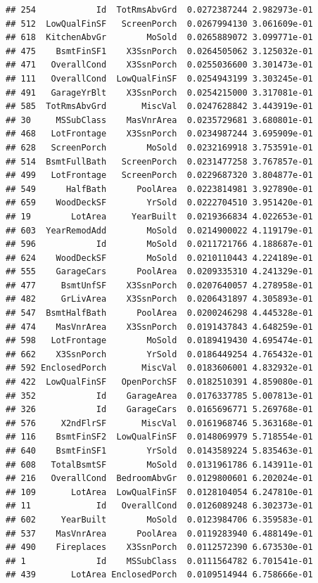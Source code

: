 \documentclass[american,]{article}
\theoremstyle{definition}
\theoremstyle{definition}
\theoremstyle{definition}
\theoremstyle{remark}
\begin{document}
\begin{verbatim}
## 254            Id  TotRmsAbvGrd  0.0272387244 2.982973e-01
## 512  LowQualFinSF   ScreenPorch  0.0267994130 3.061609e-01
## 618  KitchenAbvGr        MoSold  0.0265889072 3.099771e-01
## 475    BsmtFinSF1    X3SsnPorch  0.0264505062 3.125032e-01
## 471   OverallCond    X3SsnPorch  0.0255036600 3.301473e-01
## 111   OverallCond  LowQualFinSF  0.0254943199 3.303245e-01
## 491   GarageYrBlt    X3SsnPorch  0.0254215000 3.317081e-01
## 585  TotRmsAbvGrd       MiscVal  0.0247628842 3.443919e-01
## 30     MSSubClass    MasVnrArea  0.0235729681 3.680801e-01
## 468   LotFrontage    X3SsnPorch  0.0234987244 3.695909e-01
## 628   ScreenPorch        MoSold  0.0232169918 3.753591e-01
## 514  BsmtFullBath   ScreenPorch  0.0231477258 3.767857e-01
## 499   LotFrontage   ScreenPorch  0.0229687320 3.804877e-01
## 549      HalfBath      PoolArea  0.0223814981 3.927890e-01
## 659    WoodDeckSF        YrSold  0.0222704510 3.951420e-01
## 19        LotArea     YearBuilt  0.0219366834 4.022653e-01
## 603  YearRemodAdd        MoSold  0.0214900022 4.119179e-01
## 596            Id        MoSold  0.0211721766 4.188687e-01
## 624    WoodDeckSF        MoSold  0.0210110443 4.224189e-01
## 555    GarageCars      PoolArea  0.0209335310 4.241329e-01
## 477     BsmtUnfSF    X3SsnPorch  0.0207640057 4.278958e-01
## 482     GrLivArea    X3SsnPorch  0.0206431897 4.305893e-01
## 547  BsmtHalfBath      PoolArea  0.0200246298 4.445328e-01
## 474    MasVnrArea    X3SsnPorch  0.0191437843 4.648259e-01
## 598   LotFrontage        MoSold  0.0189419430 4.695474e-01
## 662    X3SsnPorch        YrSold  0.0186449254 4.765432e-01
## 592 EnclosedPorch       MiscVal  0.0183606001 4.832932e-01
## 422  LowQualFinSF   OpenPorchSF  0.0182510391 4.859080e-01
## 352            Id    GarageArea  0.0176337785 5.007813e-01
## 326            Id    GarageCars  0.0165696771 5.269768e-01
## 576     X2ndFlrSF       MiscVal  0.0161968746 5.363168e-01
## 116    BsmtFinSF2  LowQualFinSF  0.0148069979 5.718554e-01
## 640    BsmtFinSF1        YrSold  0.0143589224 5.835463e-01
## 608   TotalBsmtSF        MoSold  0.0131961786 6.143911e-01
## 216   OverallCond  BedroomAbvGr  0.0129800601 6.202024e-01
## 109       LotArea  LowQualFinSF  0.0128104054 6.247810e-01
## 11             Id   OverallCond  0.0126089248 6.302373e-01
## 602     YearBuilt        MoSold  0.0123984706 6.359583e-01
## 537    MasVnrArea      PoolArea  0.0119283940 6.488149e-01
## 490    Fireplaces    X3SsnPorch  0.0112572390 6.673530e-01
## 1              Id    MSSubClass  0.0111564782 6.701541e-01
## 439       LotArea EnclosedPorch  0.0109514944 6.758666e-01

\end{verbatim}
\end{document}
